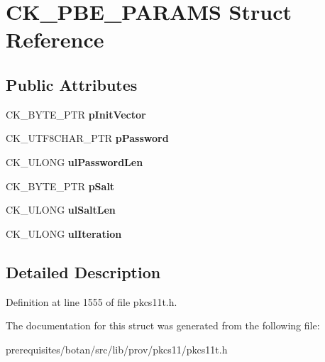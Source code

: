 \hypertarget{struct_c_k___p_b_e___p_a_r_a_m_s}{}\section{C\+K\+\_\+\+P\+B\+E\+\_\+\+P\+A\+R\+A\+MS Struct Reference}
\label{struct_c_k___p_b_e___p_a_r_a_m_s}
\subsection*{Public Attributes}
\begin{DoxyCompactItemize}
\item 
\mbox{\label{struct_c_k___p_b_e___p_a_r_a_m_s_af6439037175aecb9ef4b8cd78a25dfce}} 
C\+K\+\_\+\+B\+Y\+T\+E\+\_\+\+P\+TR {\bfseries p\+Init\+Vector}
\item 
\mbox{\label{struct_c_k___p_b_e___p_a_r_a_m_s_a852949cd067d93ed657f77feb19796df}} 
C\+K\+\_\+\+U\+T\+F8\+C\+H\+A\+R\+\_\+\+P\+TR {\bfseries p\+Password}
\item 
\mbox{\label{struct_c_k___p_b_e___p_a_r_a_m_s_a0571a4e448396bcf480e58e3b137e15f}} 
C\+K\+\_\+\+U\+L\+O\+NG {\bfseries ul\+Password\+Len}
\item 
\mbox{\label{struct_c_k___p_b_e___p_a_r_a_m_s_af68023bb005478be6415e430d23cf4a4}} 
C\+K\+\_\+\+B\+Y\+T\+E\+\_\+\+P\+TR {\bfseries p\+Salt}
\item 
\mbox{\label{struct_c_k___p_b_e___p_a_r_a_m_s_ada93c47b07a867140453cce890cd17be}} 
C\+K\+\_\+\+U\+L\+O\+NG {\bfseries ul\+Salt\+Len}
\item 
\mbox{\label{struct_c_k___p_b_e___p_a_r_a_m_s_aef88e5c2a740c2fa2ad542ffc3a7fb50}} 
C\+K\+\_\+\+U\+L\+O\+NG {\bfseries ul\+Iteration}
\end{DoxyCompactItemize}


\subsection{Detailed Description}


Definition at line 1555 of file pkcs11t.\+h.



The documentation for this struct was generated from the following file\+:\begin{DoxyCompactItemize}
\item 
prerequisites/botan/src/lib/prov/pkcs11/pkcs11t.\+h\end{DoxyCompactItemize}
